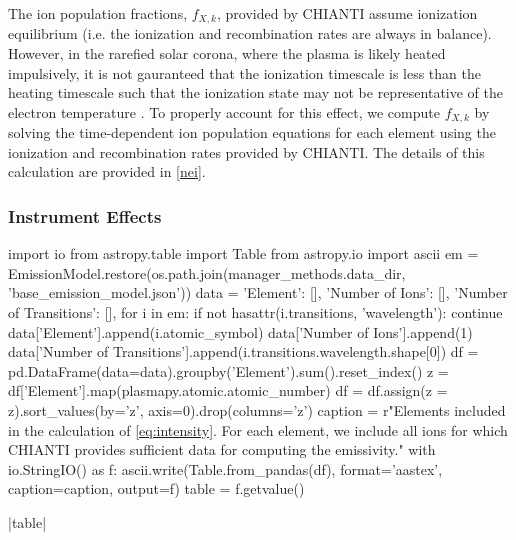 The ion population fractions, $f_{X,k}$, provided by CHIANTI assume ionization equilibrium (i.e. the ionization and recombination rates are always in balance). However, in the rarefied solar corona, where the plasma is likely heated impulsively, it is not gauranteed that the ionization timescale is less than the heating timescale such that the ionization state may not be representative of the electron temperature \citep{bradshaw_explosive_2006,reale_nonequilibrium_2008,bradshaw_numerical_2009}. To properly account for this effect, we compute $f_{X,k}$ by solving the time-dependent ion population equations for each element using the ionization and recombination rates provided by CHIANTI. The details of this calculation are provided in \autoref{nei}.

\subsubsection{Instrument Effects}\label{instrument}

\begin{pycode}
import io
from astropy.table import Table
from astropy.io import ascii
em = EmissionModel.restore(os.path.join(manager_methods.data_dir, 'base_emission_model.json'))
data = {'Element': [], 'Number of Ions': [], 'Number of Transitions': [],}
for i in em:
    if not hasattr(i.transitions, 'wavelength'):
        continue
    data['Element'].append(i.atomic_symbol)
    data['Number of Ions'].append(1)
    data['Number of Transitions'].append(i.transitions.wavelength.shape[0])
df = pd.DataFrame(data=data).groupby('Element').sum().reset_index()
z = df['Element'].map(plasmapy.atomic.atomic_number)
df = df.assign(z = z).sort_values(by='z', axis=0).drop(columns='z')
caption = r"Elements included in the calculation of \autoref{eq:intensity}. For each element, we include all ions for which CHIANTI provides sufficient data for computing the emissivity.\label{tab:elements}"
with io.StringIO() as f:
    ascii.write(Table.from_pandas(df), format='aastex', caption=caption, output=f)
    table = f.getvalue()
\end{pycode}
|table|

